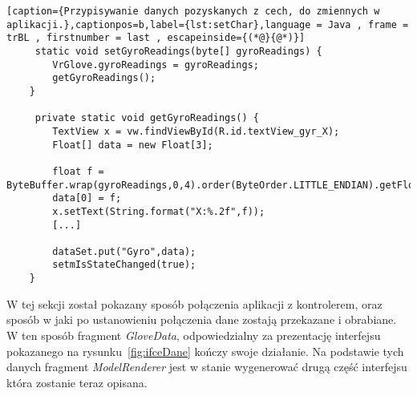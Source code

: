 \begin{lstlisting}[caption={Przypisywanie danych pozyskanych z cech, do zmiennych w aplikacji.},captionpos=b,label={lst:setChar},language = Java , frame = trBL , firstnumber = last , escapeinside={(*@}{@*)}]     
     static void setGyroReadings(byte[] gyroReadings) {
        VrGlove.gyroReadings = gyroReadings;
        getGyroReadings();
    }      
    
     private static void getGyroReadings() {
        TextView x = vw.findViewById(R.id.textView_gyr_X);
        Float[] data = new Float[3];
        
        float f = ByteBuffer.wrap(gyroReadings,0,4).order(ByteOrder.LITTLE_ENDIAN).getFloat();
        data[0] = f;
        x.setText(String.format("X:%.2f",f));
      	[...]

        dataSet.put("Gyro",data);
        setmIsStateChanged(true);
    }                                      
\end{lstlisting}

W tej sekcji został pokazany sposób połączenia aplikacji z kontrolerem, oraz sposób w jaki po ustanowieniu połączenia dane zostają przekazane i obrabiane. W ten sposób fragment \textit{GloveData}, odpowiedzialny za prezentację interfejsu pokazanego na rysunku~\ref{fig:ifceDane} kończy swoje działanie. Na podstawie tych danych fragment \textit{ModelRenderer} jest w stanie wygenerować drugą część interfejsu która zostanie teraz opisana.

